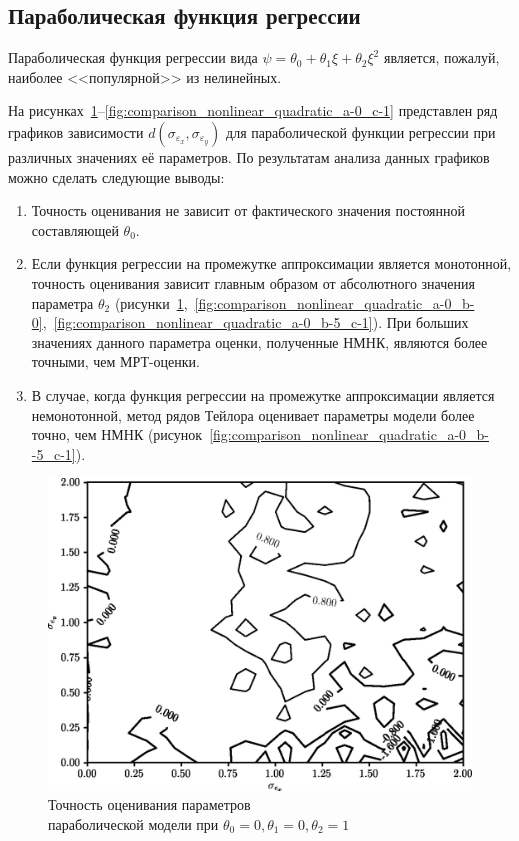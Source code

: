 \pagebreak
\subsection{Параболическая функция регрессии}

Параболическая функция регрессии вида
\( \psi = \theta_0 + \theta_1 \xi + \theta_2 \xi^2 \)
является, пожалуй, наиболее <<популярной>> из нелинейных.

На рисунках~\ref{fig:comparison_nonlinear_quadratic_a-0_b-0_c-1}--\ref{fig:comparison_nonlinear_quadratic_a-0_c-1} представлен ряд графиков зависимости \( d(\sigma_{\varepsilon_x}, \sigma_{\varepsilon_y}) \)
для параболической функции регрессии при различных значениях её параметров.
По результатам анализа данных графиков можно сделать следующие выводы:
\begin{enumerate}
\item Точность оценивания не зависит от фактического значения постоянной составляющей \( \theta_0 \).
\item Если функция регрессии на промежутке аппроксимации является монотонной,
  точность оценивания зависит главным образом от абсолютного значения параметра \( \theta_2 \)
  (рисунки~\ref{fig:comparison_nonlinear_quadratic_a-0_b-0_c-1},~\ref{fig:comparison_nonlinear_quadratic_a-0_b-0},~\ref{fig:comparison_nonlinear_quadratic_a-0_b-5_c-1}).
  При больших значениях данного параметра оценки, полученные НМНК,
  являются более точными, чем МРТ-оценки.
\item В случае, когда функция регрессии на промежутке аппроксимации является немонотонной,
  метод рядов Тейлора оценивает параметры модели более точно, чем НМНК
  (рисунок~\ref{fig:comparison_nonlinear_quadratic_a-0_b--5_c-1}).
\end{enumerate}

\begin{figure}[b]
  \centering
  \includegraphics[width=135mm]{fig/nonlinear/quadratic/a-0_b-0_c-1.png}
  \caption{
    Точность оценивания параметров \\
    параболической модели при \( \theta_0 = 0, \theta_1 = 0, \theta_2 = 1 \)
  }\label{fig:comparison_nonlinear_quadratic_a-0_b-0_c-1}
\end{figure}

